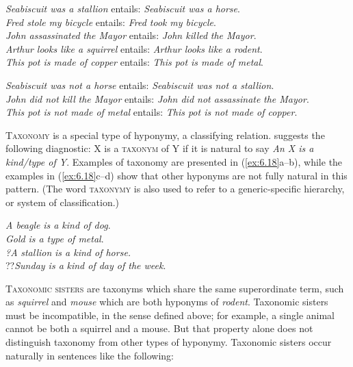 \ea \label{ex:6.16}
\ea \textit{Seabiscuit was a stallion}  entails:  \textit{Seabiscuit was a horse}.\\
\ex \textit{Fred stole} \textit{my bicycle}  entails:  \textit{Fred took} \textit{my bicycle}.\\
\ex \textit{John assassinated} \textit{the Mayor}  entails:  \textit{John killed} \textit{the Mayor}.\\
\ex \textit{Arthur looks like a squirrel}  entails:  \textit{Arthur looks like a rodent}.\\
\ex \textit{This pot is made of copper}  entails:  \textit{This pot is made of metal}.
                       \z
\z

\ea \label{ex:6.17}
\ea \textit{Seabiscuit was not a horse}  entails:  \textit{Seabiscuit was not a stallion}.\\
\ex \textit{John did not kill} \textit{the Mayor}  entails:  \textit{John did not assassinate} \textit{the Mayor}.\\
\ex \textit{This pot is not made of metal}  entails:  \textit{This pot is not made of copper}.
                       \z
\z


\textsc{Taxonomy} is a special type of hyponymy, a classifying relation. \citet[137]{Cruse1986} suggests the following diagnostic: X is a \textsc{taxonym} of Y if it is natural to say \textit{An X is a kind/type of Y}. Examples of taxonomy are presented in (\ref{ex:6.18}a--b), while the examples in (\ref{ex:6.18}c--d) show that other hyponyms are not fully natural in this pattern. (The word \textsc{taxonymy} is also used to refer to a generic-specific hierarchy, or system of classification.)


\ea \label{ex:6.18}
\ea \textit{A beagle} \textit{is a kind of dog}.\\
\ex \textit{Gold} \textit{is a type of metal}.\\
\ex \textit{?A} \textit{stallion} \textit{is a kind of horse.}\\
\ex ??\textit{Sunday is a} \textit{kind of day of the week}.
                       \z
\z


\textsc{Taxonomic sisters} are taxonyms which share the same superordinate term, such as \textit{squirrel} and \textit{mouse} which are both hyponyms of \textit{rodent}. Taxonomic sisters must be incompatible, in the sense defined above; for example, a single animal cannot be both a squirrel and a mouse. But that property alone does not distinguish taxonomy from other types of hyponymy. Taxonomic sisters occur naturally in sentences like the following:

